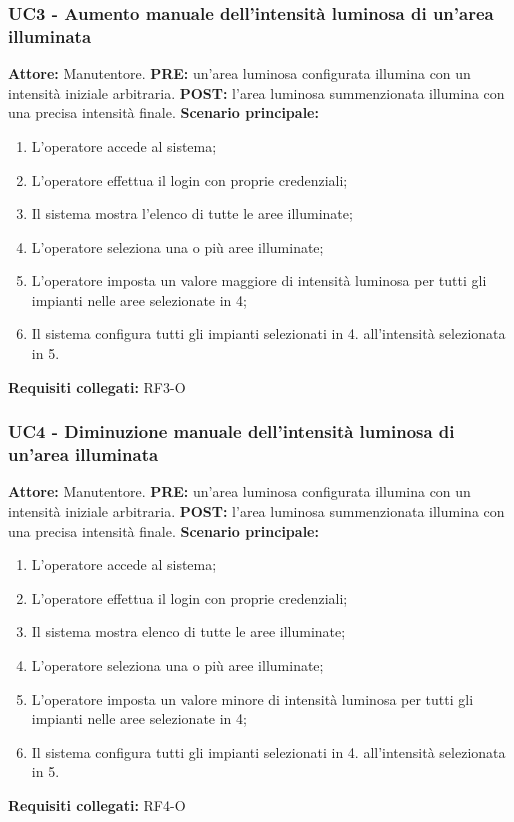 \documentclass[a4paper, 12pt]{article}
\begin{document}
\subsubsection{UC3 - Aumento manuale dell'intensità luminosa di un'area illuminata}
\textbf{Attore:} Manutentore.\newline
\textbf{PRE:} un'area luminosa configurata illumina con un intensità iniziale arbitraria.\newline
\textbf{POST:} l'area luminosa summenzionata illumina con una precisa intensità finale.\newline
\textbf{Scenario principale:}
\begin{enumerate}
    \item L'operatore accede al sistema;
    \item L'operatore effettua il login con proprie credenziali;
    \item Il sistema mostra l'elenco di tutte le aree illuminate;
    \item L'operatore seleziona una o più aree illuminate;
    \item L'operatore imposta un valore maggiore di intensità luminosa per tutti gli impianti nelle aree selezionate in 4;
    \item Il sistema configura tutti gli impianti selezionati in 4. all'intensità selezionata in 5.
\end{enumerate}
\textbf{Requisiti collegati:} RF3-O\newline

\subsubsection{UC4 - Diminuzione manuale dell'intensità luminosa di un'area illuminata}
\textbf{Attore:} Manutentore.\newline
\textbf{PRE:} un'area luminosa configurata illumina con un intensità iniziale arbitraria.\newline
\textbf{POST:} l'area luminosa summenzionata illumina con una precisa intensità finale.\newline
\textbf{Scenario principale:}
\begin{enumerate}
    \item L'operatore accede al sistema;
    \item L'operatore effettua il login con proprie credenziali;
    \item Il sistema mostra elenco di tutte le aree illuminate;
    \item L'operatore seleziona una o più aree illuminate;
    \item L'operatore imposta un valore minore di intensità luminosa per tutti gli impianti nelle aree selezionate in 4;
    \item Il sistema configura tutti gli impianti selezionati in 4. all'intensità selezionata in 5.
\end{enumerate}
\textbf{Requisiti collegati:} RF4-O\newline
\end{document}
